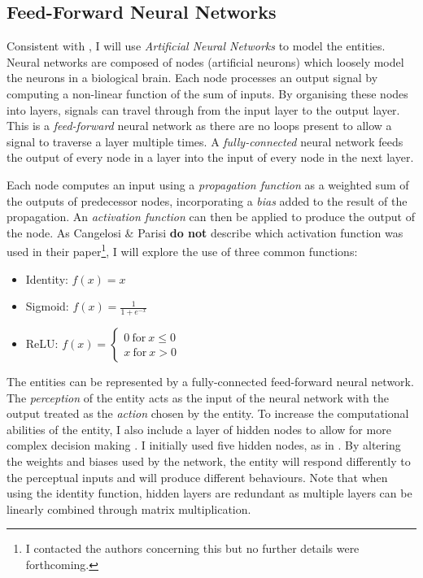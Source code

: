 \documentclass[12pt,a4paper]{report}
\begin{document}
\subsection{Feed-Forward Neural Networks}\label{section:neural}

Consistent with \citet{Cangelosi1998}, I will use \emph{Artificial Neural Networks} to model the entities. Neural networks are composed of nodes (artificial neurons) which loosely model the neurons in a biological brain. Each node processes an output signal by computing a non-linear function of the sum of inputs. By organising these nodes into layers, signals can travel through from the input layer to the output layer. This is a \emph{feed-forward} neural network as there are no loops present to allow a signal to traverse a layer multiple times. A \emph{fully-connected} neural network feeds the output of every node in a layer into the input of every node in the next layer. 

Each node computes an input using a \emph{propagation function} as a weighted sum of the outputs of predecessor nodes, incorporating a \emph{bias} added to the result of the propagation. An \emph{activation function} can then be applied to produce the output of the node. As Cangelosi \& Parisi {\bf do not} describe which activation function was used in their paper\footnote{I contacted the authors concerning this but no further details were forthcoming.}, I will explore the use of three common functions:

\begin{itemize}
	\item Identity: $f(x) = x$
	\item Sigmoid: $f(x) = \frac{1}{1+e^{-x}}$
	\item ReLU: $ f(x) = 
    \left\{
        \begin{array}{ll}
          0~\mathrm{for}~x \leq 0 \\
          x~\mathrm{for}~x > 0
        \end{array}
      \right.
      $
\end{itemize}

The entities can be represented by a fully-connected feed-forward neural network. The  \emph{perception} of the entity acts as the input of the neural network with the output treated as the \emph{action} chosen by the entity. To increase the computational abilities of the entity, I also include a layer of hidden nodes to allow for more complex decision making \citep{de1993backpropagation}. I initially used five hidden nodes, as in \citet{Cangelosi1998}. By altering the weights and biases used by the network, the entity will respond differently to the perceptual inputs and will produce different behaviours. Note that when using the identity function, hidden layers are redundant as multiple layers can be linearly combined through matrix multiplication.
\end{document}
